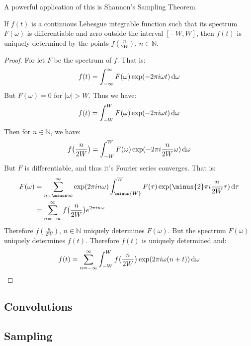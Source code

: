         A powerful application of this is
        Shannon's Sampling Theorem.
        \begin{theorem}
            If $f(t)$ is a continuous
            Lebesgue integrable function such that
            its spectrum $F(\omega)$ is differentiable and zero
            outside the interval $[-W,W]$,
            then $f(t)$ is uniquely determined
            by the points $f(\frac{n}{2W})$, $n\in\mathbb{N}$.
        \end{theorem}
        \begin{proof}
            For let $F$ be the spectrum of $f$. That is:
            \begin{equation}
                f(t)=\int_{-\infty}^{\infty}F(\omega)
                \exp(-2\pi{i}\omega{t})\mathop{}\!\mathrm{d}{\omega}
            \end{equation}
            But $F(\omega)=0$ for $|\omega|>W$. Thus we have:
            \begin{equation}
                f(t)=\int_{-W}^{W}F(\omega)
                \exp(-2\pi{i}\omega{t})\mathop{}\!\mathrm{d}{\omega}
            \end{equation}
            Then for $n\in\mathbb{N}$, we have:
            \begin{equation}
                f\big(\frac{n}{2W}\big)=\int_{-W}^{W}F(\omega)
                \exp(-2\pi{i}\frac{n}{2W}\omega)\mathop{}\!\mathrm{d}{\omega}
            \end{equation}
            But $F$ is differentiable, and thus it's Fourier
            series converges. That is:
            \begin{subequations}
                \begin{align}
                    F(\omega)
                    &=\sum_{n=\minus\infty}^{\infty}
                        \exp(2\pi{i}n\omega)
                    \int_{\minus{W}}^{W}F(\tau)
                    \exp(\minus{2}\pi{i}\frac{n}{2W}\tau)
                        \diff{\tau}\\
                    &=\sum_{n=-\infty}^{\infty}f
                      \big(\frac{n}{2W}\big)e^{2\pi{i}n\omega}
                \end{align}
            \end{subequations}
            Therefore $f(\frac{n}{2W})$, $n\in \mathbb{N}$
            uniquely determines $F(\omega)$. But the
            spectrum $F(\omega)$ uniquely determines
            $f(t)$. Therefore $f(t)$ is
            uniquely determined and:
            \begin{equation}
                f(t)=\sum_{n=-\infty}^{\infty}\int_{-W}^{W}
                f\big(\frac{n}{2W}\big)
                \exp(2\pi{i}\omega(n+t))\mathop{}\!\mathrm{d}{\omega}
            \end{equation}
        \end{proof}
    \subsection{Convolutions}
    \subsection{Sampling}

